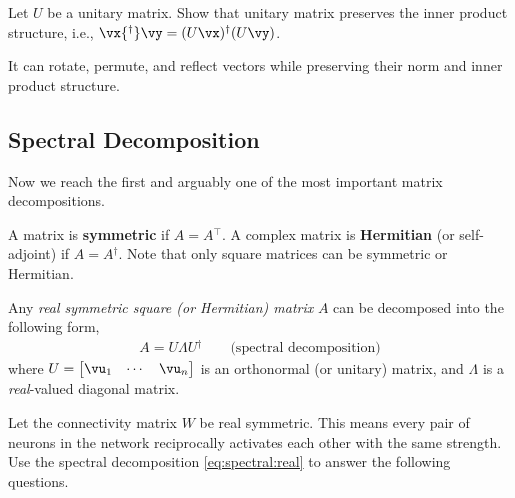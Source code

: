 \documentclass[a4paper,11pt]{exam}
\newcounter{ct}
\newcommand{\trp}{{^\top}} %
\newcommand{\ctrp}{{^\dagger}} %
\begin{document}
\begin{questions}
\question Let $U$ be a unitary matrix. Show that unitary matrix preserves the inner product structure, i.e., $\vx\ctrp \vy = (U \vx)\ctrp (U\vy)$.

\begin{tcolorbox}[colback=black!1!,title=Unitary or Orthonormal Matrix]
    It can rotate, permute, and reflect vectors while preserving their norm and inner product structure.
\end{tcolorbox}

\clearpage
\subsection{Spectral Decomposition}
Now we reach the first and arguably one of the most important matrix decompositions.

A matrix is \textbf{symmetric} if $A = A\trp$. A complex matrix is \textbf{Hermitian} (or self-adjoint) if $A = A\ctrp$.
Note that only square matrices can be symmetric or Hermitian.

\begin{tcolorbox}[colback=black!1!,title=Spectral theorem for Hermitian matrices]
Any \textit{real symmetric square (or Hermitian) matrix} $A$ can be decomposed into the following form,
\begin{align}\label{eq:spectral:real}
    A = U \Lambda U\ctrp \qquad \text{(spectral decomposition)}
\end{align}
where $U = \begin{bmatrix}\vu_1 & \cdots & \vu_n \end{bmatrix}$
is an orthonormal (or unitary) matrix, and $\Lambda$ is a \emph{real}-valued diagonal matrix.
\end{tcolorbox}

\question Let the connectivity matrix $W$ be real symmetric. This means every pair of neurons in the network reciprocally activates each other with the same strength.
Use the spectral decomposition \eqref{eq:spectral:real} to answer the following questions.
\end{questions}
\end{document}
